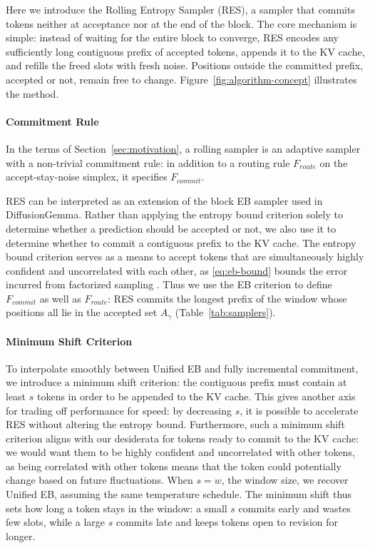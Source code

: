 Here we introduce the Rolling Entropy Sampler (RES), a sampler that commits tokens neither at acceptance nor at the end of the block.
The core mechanism is simple: instead of waiting for the entire block to converge, RES encodes any sufficiently long contiguous prefix of accepted tokens, appends it to the KV cache, and refills the freed slots with fresh noise.
Positions outside the committed prefix, accepted or not, remain free to change.
Figure~\ref{fig:algorithm-concept} illustrates the method.


\paragraph{Commitment Rule}
In the terms of Section~\ref{sec:motivation}, a rolling sampler is an adaptive sampler with a non-trivial commitment rule: in addition to a routing rule $F_{route}$ on the accept-stay-noise simplex, it specifies $F_{commit}$.

RES can be interpreted as an extension of the block EB sampler used in DiffusionGemma.
Rather than applying the entropy bound criterion solely to determine whether a prediction should be accepted or not, we also use it to determine whether to commit a contiguous prefix to the KV cache.
The entropy bound criterion serves as a means to accept tokens that are simultaneously highly confident and uncorrelated with each other, as \eqref{eq:eb-bound} bounds the error incurred from factorized sampling \citep{ben2026accelerated}.
Thus we use the EB criterion to define $F_{commit}$ as well as $F_{route}$: RES commits the longest prefix of the window whose positions all lie in the accepted set $A_{\gamma}$ (Table~\ref{tab:samplers}).

\paragraph{Minimum Shift Criterion}
To interpolate smoothly between Unified EB and fully incremental commitment, we introduce a minimum shift criterion: the contiguous prefix must contain at least $s$ tokens in order to be appended to the KV cache. This gives another axis for trading off performance for speed: by decreasing $s$, it is possible to accelerate RES without altering the entropy bound.
Furthermore, such a minimum shift criterion aligns with our desiderata for tokens ready to commit to the KV cache: we would want them to be highly confident and uncorrelated with other tokens, as being correlated with other tokens means that the token could potentially change based on future fluctuations.
When $s=w$, the window size, we recover Unified EB, assuming the same temperature schedule.
The minimum shift thus sets how long a token stays in the window: a small $s$ commits early and wastes few slots, while a large $s$ commits late and keeps tokens open to revision for longer.

